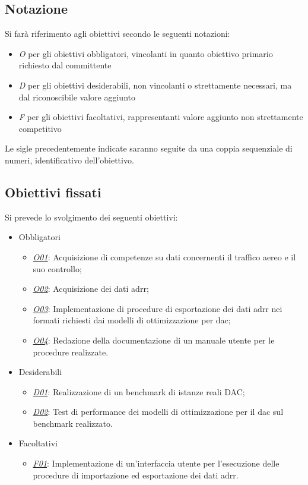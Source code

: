 \subsection{Notazione}
Si farà riferimento agli obiettivi secondo le seguenti notazioni:
\begin{itemize}
	\item \textit{O} per gli obiettivi obbligatori, vincolanti in quanto obiettivo primario richiesto dal committente
	\item \textit{D} per gli obiettivi desiderabili, non vincolanti o strettamente necessari,
		  ma dal riconoscibile valore aggiunto
	\item \textit{F} per gli obiettivi facoltativi, rappresentanti valore aggiunto non strettamente 
		  competitivo
\end{itemize}

Le sigle precedentemente indicate saranno seguite da una coppia sequenziale di numeri, identificativo dell'obiettivo.

\DisablePunct 
\subsection{Obiettivi fissati}
Si prevede lo svolgimento dei seguenti obiettivi:
\begin{itemize}
	\item Obbligatori
	\begin{itemize}
		\item \underline{\textit{O01}}: Acquisizione di competenze su dati concernenti il traffico aereo e il suo controllo;
	    \item \underline{\textit{O02}}: Acquisizione dei dati \gls{adrr};
	    \item \underline{\textit{O03}}: Implementazione di procedure di esportazione dei dati \gls{adrr} nei formati richiesti dai modelli di ottimizzazione per \gls{dac};
	    \item \underline{\textit{O04}}: Redazione della documentazione di un manuale utente per le procedure realizzate.
	\end{itemize}
	
	\item Desiderabili 
	\begin{itemize}
	   \item \underline{\textit{D01}}: Realizzazione di un benchmark di istanze reali DAC;
	   \item \underline{\textit{D02}}: Test di performance dei modelli di ottimizzazione per il \gls{dac} sul benchmark realizzato.	
	\end{itemize}
	\item Facoltativi
	\begin{itemize}
	   \item \underline{\textit{F01}}: Implementazione di un'interfaccia utente per l'esecuzione delle procedure di importazione ed esportazione dei dati \gls{adrr}.
	\end{itemize} 
\end{itemize}
\EnablePunct


